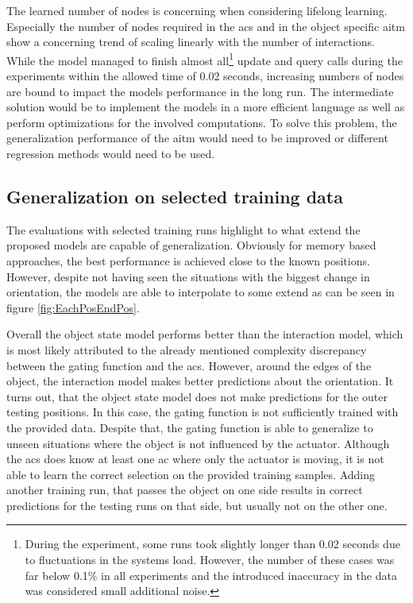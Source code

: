 The learned number of nodes is concerning when considering lifelong learning. Especially the number of nodes required in the \gls{acs} and in the object specific \gls{aitm} show a concerning trend of scaling linearly with the number of interactions.
While the model managed to finish almost all\footnote{During the experiment, some runs took slightly longer than 0.02 seconds due to fluctuations in the systems load. However, the number of these cases was far below 0.1\% in all experiments and the introduced inaccuracy in the data was considered small additional noise. } update and query calls during the experiments within the allowed time of 0.02 seconds, increasing numbers of nodes are bound to impact the models performance in the long run. The intermediate solution would be to implement the models in a more efficient language as well as perform optimizations for the involved computations. To solve this problem, the generalization performance of the \gls{aitm} would need to be improved or different regression methods would need to be used. 

\subsection{Generalization on selected training data}

The evaluations with selected training runs highlight to what extend the proposed models are capable of generalization. Obviously for memory based approaches, the best performance is achieved close to the known positions. However, despite not having seen the situations with the biggest change in orientation, the models are able to interpolate to some extend as can be seen in figure \ref{fig:EachPosEndPos}.

Overall the object state model performs better than the interaction model, which is most likely attributed to the already mentioned complexity discrepancy between the gating function and the \gls{acs}. 
However, around the edges of the object, the interaction model makes better predictions about the orientation. It turns out, that the object state model does not make predictions for the outer testing positions. In this case, the gating function is not sufficiently trained with the provided data.
Despite that, the gating function is able to generalize to unseen situations where the object is not influenced by the actuator. Although the \gls{acs} does know at least one \gls{ac} where only the actuator is moving, it is not able to learn the correct selection on the provided training samples.
Adding another training run, that passes the object on one side results in correct predictions for the testing runs on that side, but usually not on the other one.


